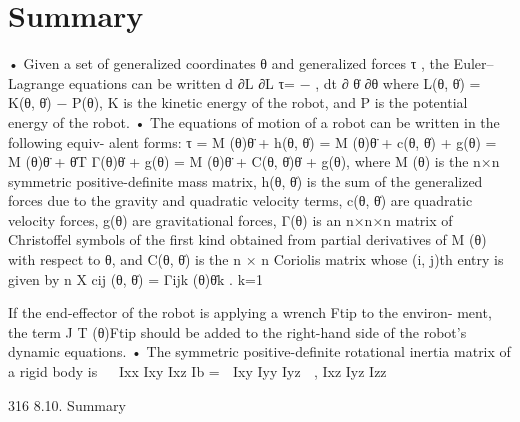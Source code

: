 \documentclass[12pt,a4paper]{article}
\begin{document}
\section{Summary}
    • Given a set of generalized coordinates θ and generalized forces τ , the
      Euler–Lagrange equations can be written
                                                  d ∂L ∂L
                                            τ=            −    ,
                                                  dt ∂ θ̇   ∂θ
       where L(θ, θ̇) = K(θ, θ̇) − P(θ), K is the kinetic energy of the robot, and
       P is the potential energy of the robot.
    • The equations of motion of a robot can be written in the following equiv-
      alent forms:
                                  τ    =    M (θ)θ̈ + h(θ, θ̇)
                                       =    M (θ)θ̈ + c(θ, θ̇) + g(θ)
                                       =    M (θ)θ̈ + θ̇T Γ(θ)θ̇ + g(θ)
                                       =    M (θ)θ̈ + C(θ, θ̇)θ̇ + g(θ),
       where M (θ) is the n×n symmetric positive-definite mass matrix, h(θ, θ̇) is
       the sum of the generalized forces due to the gravity and quadratic velocity
       terms, c(θ, θ̇) are quadratic velocity forces, g(θ) are gravitational forces,
       Γ(θ) is an n×n×n matrix of Christoffel symbols of the first kind obtained
       from partial derivatives of M (θ) with respect to θ, and C(θ, θ̇) is the n × n
       Coriolis matrix whose (i, j)th entry is given by
                                                        n
                                                        X
                                        cij (θ, θ̇) =         Γijk (θ)θ̇k .
                                                        k=1

       If the end-effector of the robot is applying a wrench Ftip to the environ-
       ment, the term J T (θ)Ftip should be added to the right-hand side of the
       robot’s dynamic equations.
    • The symmetric positive-definite rotational inertia matrix of a rigid body
      is                                            
                                     Ixx Ixy Ixz
                            Ib =  Ixy Iyy Iyz  ,
                                     Ixz Iyz Izz


316                                                                                  8.10. Summary
\end{document}
